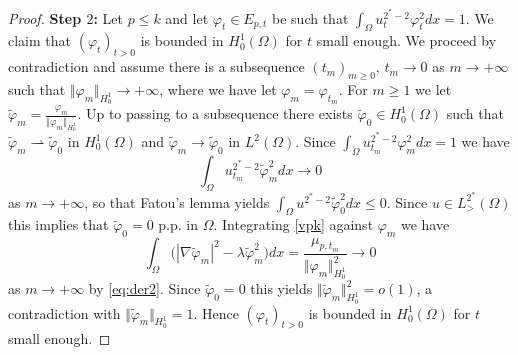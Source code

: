 \documentclass[10pt]{amsart}
\numberwithin{equation}{section}
\newcommand{\vp}{\varphi}
\newcommand{\Om}{\Omega}
\theoremstyle{plain}
\theoremstyle{remark}
\begin{document}
\begin{proof}
\textbf{Step $2$:} Let $p \le k$ and let $\vp_{t} \in E_{p,t}$ be such that $\int_\Om u_t^{2^*-2} \vp_{t}^2dx = 1$. We claim that $(\vp_{t})_{t>0}$ is bounded in $H^1_0(\Om)$ for $t$ small enough. We proceed by contradiction and assume there is a subsequence $(t_m)_{m \ge0}$, $t_m \to 0$ as $m \to + \infty$ such that $\Vert \vp_{m} \Vert_{H^1_0} \to + \infty$, where we have let $\vp_{m}=\vp_{t_m}$. For $m \ge 1$ we let $\tilde{\vp}_{m} =  \frac{\vp_{m}}{\Vert \vp_{m}\Vert_{H^1_0}}$. Up to passing to a subsequence there exists $\tilde{\vp}_0 \in H^1_0(\Om)$ such that $\tilde{\vp}_{m} \rightharpoonup \tilde{\vp}_0$ in $H^1_0(\Om)$ and $\tilde{\vp}_{m} \to \tilde{\vp}_0$ in $L^2(\Om)$. Since $\int_{\Om} u_{t_m}^{2^*-2} \vp_{m}^2dx = 1$ we have
$$ \int_{\Om} u_{t_m}^{2^*-2} \tilde{\vp}_{m}^2dx \to 0 $$
as $ m \to + \infty$, so that Fatou's lemma yields $\int_\Om u^{2^*-2} \tilde{\vp}_0^2dx \le 0$. Since $u \in L^{2^*}_{>}(\Om)$ this implies that $\tilde{\vp}_0 = 0$ p.p. in $\Om$. Integrating \eqref{vpk} against $\vp_{m}$ we have 
$$\int_{\Om}\big( |\nabla \tilde{\vp}_{m}|^2 - \lambda \tilde{\vp}_{m}^2 \big) dx  = \frac{\mu_{p,t_m}}{\Vert \vp_{m}\Vert_{H^1_0}^2} \to 0 $$
as $m \to + \infty$ by \eqref{eq:der2}. Since  $\tilde{\vp}_0 = 0$ this yields $\Vert \tilde{\vp}_{m} \Vert_{H^1_0}^2 = o(1)$, a contradiction with $\Vert \tilde{\vp}_{m} \Vert_{H^1_0} = 1$. Hence $(\vp_{t})_{t>0}$ is bounded in $H^1_0(\Om)$ for $t$ small enough. 



\medskip


\end{proof}
\end{document}
